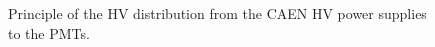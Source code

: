 \documentclass[12pt,a4paper]{article}
\newcommand{\pdftextimgpath}{./pdftex_t}
\begin{document}
\begin{figure}[h!]
  \begin{center}
    \scalebox{0.75}{}
  \end{center}
  \caption{Principle of the HV distribution from the CAEN HV power supplies to the PMTs.}
  \label{fig:calohv:principle:1}
\end{figure}

\clearpage



\end{document}
